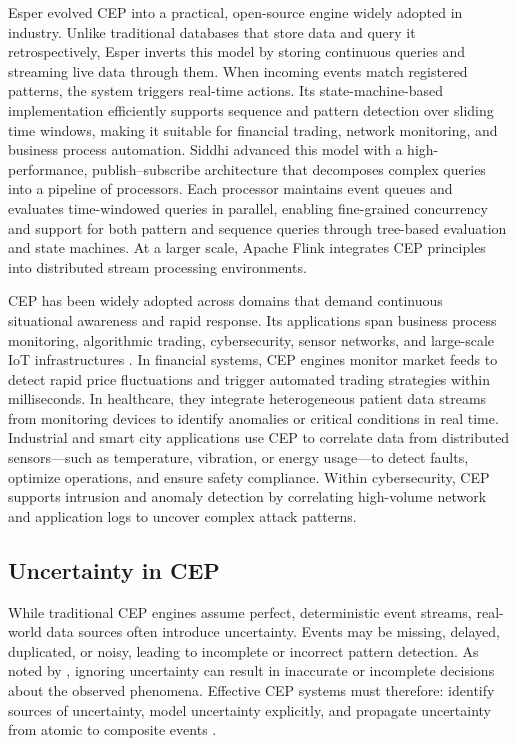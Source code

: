 Esper \citep{esper_reference} evolved CEP into a practical, open-source engine widely adopted in industry. Unlike traditional databases that store data and query it retrospectively, Esper inverts this model by storing continuous queries and streaming live data through them. When incoming events match registered patterns, the system triggers real-time actions. Its state-machine-based implementation efficiently supports sequence and pattern detection over sliding time windows, making it suitable for financial trading, network monitoring, and business process automation. Siddhi \citep{suhothayan2011siddhi} advanced this model with a high-performance, publish–subscribe architecture that decomposes complex queries into a pipeline of processors. Each processor maintains event queues and evaluates time-windowed queries in parallel, enabling fine-grained concurrency and support for both pattern and sequence queries through tree-based evaluation and state machines. At a larger scale, Apache Flink \citep{carbone2015apache} integrates CEP principles into distributed stream processing environments. 

CEP has been widely adopted across domains that demand continuous situational awareness and rapid response. Its applications span business process monitoring, algorithmic trading, cybersecurity, sensor networks, and large-scale IoT infrastructures \citep{halle2017complex}. In financial systems, CEP engines monitor market feeds to detect rapid price fluctuations and trigger automated trading strategies within milliseconds. In healthcare, they integrate heterogeneous patient data streams from monitoring devices to identify anomalies or critical conditions in real time. Industrial and smart city applications use CEP to correlate data from distributed sensors—such as temperature, vibration, or energy usage—to detect faults, optimize operations, and ensure safety compliance. Within cybersecurity, CEP supports intrusion and anomaly detection by correlating high-volume network and application logs to uncover complex attack patterns. 


\subsection{Uncertainty in CEP}\label{subsec:background-cep-uncertainty}
While traditional CEP engines assume perfect, deterministic event streams, real-world data sources often introduce uncertainty. Events may be missing, delayed, duplicated, or noisy, leading to incomplete or incorrect pattern detection. As noted by \citet{cugola2015complex}, ignoring uncertainty can result in inaccurate or incomplete decisions about the observed phenomena. Effective CEP systems must therefore: identify sources of uncertainty, model uncertainty explicitly, and propagate uncertainty from atomic to composite events \cite{cugola2015complex}. 

